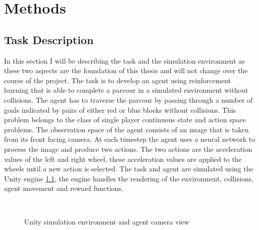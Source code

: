 \chapter{Methods}
\label{cha:Methods}

\section{Task Description}

In this section I will be describing the task and the simulation environment as these two aspects are the foundation of this thesis and will not change over the course of the project.
The task is to develop an agent using reinforcement learning that is able to complete a parcour in a simulated environment without collisions. The agent has to traverse the parcour by passing through a number of goals indicated by pairs of either red or blue blocks without collisions. This problem belongs to the class of single player continuous state and action space problems. The observation space of the agent consists of an image that is taken from its front facing camera. At each timestep the agent uses a neural network to process the image and produce two actions. The two actions are the acceleration values of the left and right wheel, these acceleration values are applied to the wheels until a new action is selected.
The task and agent are simulated using the Unity engine \ref{fig:unity}, the engine handles the rendering of the environment, collisions, agent movement and reward functions.

\begin{figure}
     \centering
     \qquad
     \\
     \caption{Unity simulation environment and agent camera view}
     \label{fig:unity}
\end{figure}

